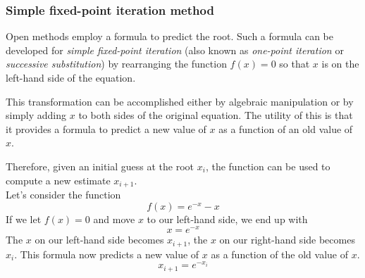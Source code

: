 \documentclass{if-beamer}
\begin{document}
\begin{frame}
\frametitle{Simple fixed-point iteration method}
Open methods employ a formula to predict the root. Such a formula can
be developed for \textit{simple fixed-point iteration} (also known as \textit{one-point iteration} or \textit{successive substitution}) by rearranging the function $f(x) = 0$ so that $x$ is on the left-hand
side of the equation. \\\vspace{7pt}

This transformation can be accomplished either by algebraic manipulation or by simply adding $x$ to both sides of the original equation. The utility of this is that it provides a formula to predict a new value of $x$ as a function of an old value of $x$.  \\\vspace{7pt}

Therefore, given an initial guess at the root $x_i$, the function can be used to compute a new estimate $x_{i+1}$. \\\vspace{7pt} 
Let's consider the function
$$f(x) = e^{-x} -x$$ 
If we let $f(x) = 0$ and move $x$ to our left-hand side, we end up with
$$x = e^{-x}$$
The $x$ on our left-hand side becomes $x_{i+1}$, the $x$ on our right-hand side becomes $x_{i}$. This formula now predicts a new value of $x$ as a function of the old value of $x$.
$$x_{i+1} = e^{-x_i}$$ 
\end{frame}
\end{document}

